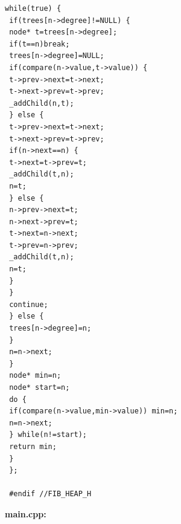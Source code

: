 \documentclass[12pt,a4paper]{article}
\theoremstyle{definition}
\begin{document}
\begin{lstlisting}[caption={fib\_heap.h}]
 while(true) {
 if(trees[n->degree]!=NULL) {
 node* t=trees[n->degree];
 if(t==n)break;
 trees[n->degree]=NULL;
 if(compare(n->value,t->value)) {
 t->prev->next=t->next;
 t->next->prev=t->prev;
 _addChild(n,t);
 } else {
 t->prev->next=t->next;
 t->next->prev=t->prev;
 if(n->next==n) {
 t->next=t->prev=t;
 _addChild(t,n);
 n=t;
 } else {
 n->prev->next=t;
 n->next->prev=t;
 t->next=n->next;
 t->prev=n->prev;
 _addChild(t,n);
 n=t;
 }
 }
 continue;
 } else {
 trees[n->degree]=n;
 }
 n=n->next;
 }
 node* min=n;
 node* start=n;
 do {
 if(compare(n->value,min->value)) min=n;
 n=n->next;
 } while(n!=start);
 return min;
 }
 };
 
 #endif //FIB_HEAP_H
 \end{lstlisting}
 
 
 
 \newpage
 \noindent \textbf{main.cpp:}
 
\end{document}

